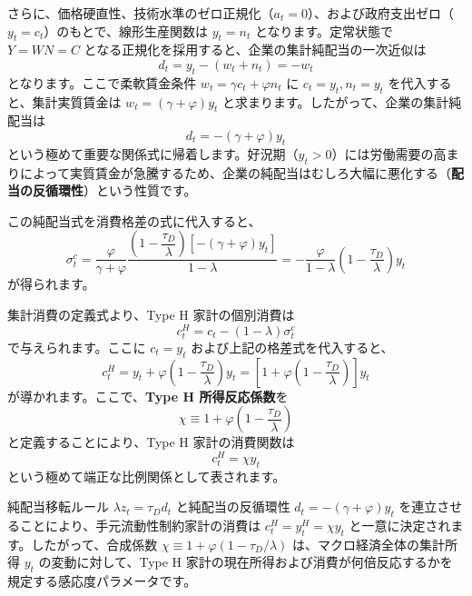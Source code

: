 \documentclass[
  japanese,
  lualatex,
  ja=standard,
  12pt,
  a4paper]{ltjsarticle}
\begin{document}
さらに、価格硬直性、技術水準のゼロ正規化（\(a_t=0\)）、および政府支出ゼロ（\(y_t=c_t\)）のもとで、線形生産関数は
\(y_t = n_t\) となります。定常状態で \(Y=WN=C\)
となる正規化を採用すると、企業の集計純配当の一次近似は \[
d_t = y_t - (w_t + n_t) = -w_t
\] となります。ここで柔軟賃金条件 \(w_t = \gamma c_t + \varphi n_t\) に
\(c_t = y_t, n_t = y_t\) を代入すると、集計実質賃金は
\(w_t = (\gamma+\varphi)y_t\)
と求まります。したがって、企業の集計純配当は \[
d_t = -(\gamma+\varphi)y_t
\]
という極めて重要な関係式に帰着します。好況期（\(y_t > 0\)）には労働需要の高まりによって実質賃金が急騰するため、企業の純配当はむしろ大幅に悪化する（\textbf{配当の反循環性}）という性質です。

この純配当式を消費格差の式に代入すると、 \[
\sigma_t^c
=
\frac{\varphi}{\gamma+\varphi} \frac{\left(1 - \dfrac{\tau_D}{\lambda}\right)[-(\gamma+\varphi)y_t]}{1-\lambda}
=
- \frac{\varphi}{1-\lambda}\left( 1 - \frac{\tau_D}{\lambda} \right) y_t
\] が得られます。

集計消費の定義式より、Type H 家計の個別消費は \[
c_t^H = c_t - (1-\lambda)\sigma_t^c
\] で与えられます。ここに \(c_t = y_t\) および上記の格差式を代入すると、
\[
c_t^H
=
y_t + \varphi\left( 1 - \frac{\tau_D}{\lambda} \right) y_t
=
\left[ 1 + \varphi\left( 1 - \frac{\tau_D}{\lambda} \right) \right] y_t
\] が導かれます。ここで、\textbf{Type H 所得反応係数}を \[
\chi \equiv 1 + \varphi\left( 1 - \frac{\tau_D}{\lambda} \right)
\] と定義することにより、Type H 家計の消費関数は \[
c_t^H = \chi y_t
\] という極めて端正な比例関係として表されます。


\begin{tcolorbox}[enhanced jigsaw, arc=.35mm, bottomrule=.15mm, bottomtitle=1mm, breakable, colback=white, colbacktitle=quarto-callout-note-color!10!white, colframe=quarto-callout-note-color-frame, coltitle=black, left=2mm, leftrule=.75mm, opacityback=0, opacitybacktitle=0.6, rightrule=.15mm, title=\textcolor{quarto-callout-note-color}{\faInfo}\hspace{0.5em}{純配当移転 TANK の要点}, titlerule=0mm, toprule=.15mm, toptitle=1mm]

純配当移転ルール \(\lambda z_t = \tau_D d_t\) と純配当の反循環性
\(d_t = -(\gamma+\varphi)y_t\)
を連立させることにより、手元流動性制約家計の消費は
\(c_t^H = y_t^H = \chi y_t\) と一意に決定されます。したがって、合成係数
\(\chi \equiv 1 + \varphi(1 - \tau_D/\lambda)\)
は、マクロ経済全体の集計所得 \(y_t\) の変動に対して、Type H
家計の現在所得および消費が何倍反応するかを規定する感応度パラメータです。

\end{tcolorbox}
\end{document}

